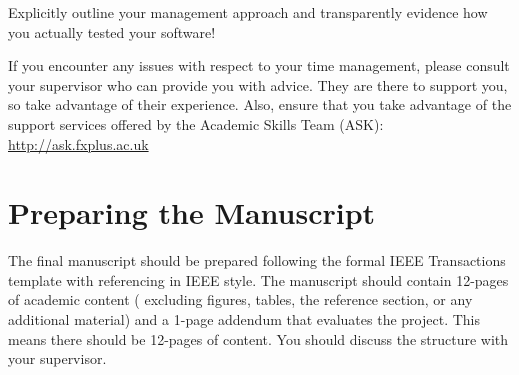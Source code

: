 Explicitly outline your management approach and transparently evidence how you actually tested your software!

If you encounter any issues with respect to your time management, please consult your supervisor who can provide you with advice. They are there to support you, so take advantage of their experience. Also, ensure that you take advantage of the support services offered by the Academic Skills Team (ASK): \url{http://ask.fxplus.ac.uk}

\section*{Preparing the Manuscript}

The final manuscript should be prepared following the formal IEEE Transactions template with referencing in IEEE style. The manuscript should contain 12-pages of academic content ( excluding figures, tables, the reference section, or any additional material) and a 1-page addendum that evaluates the project. This means there should be 12-pages of content. You should discuss the structure with your supervisor.


